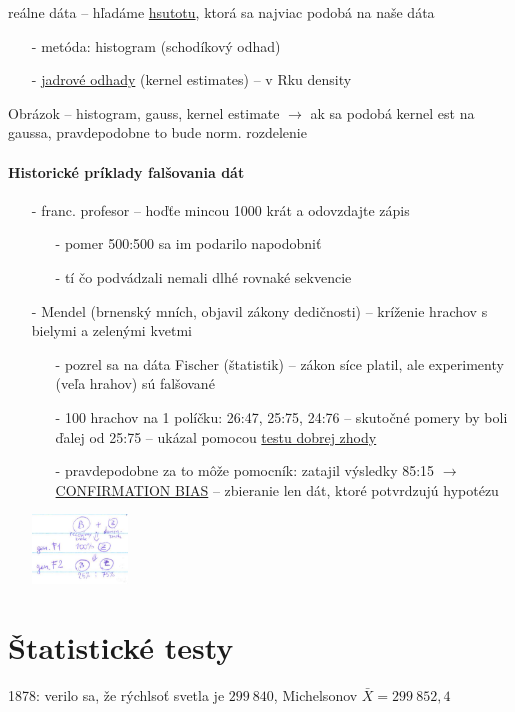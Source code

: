 \documentclass[unknownkeysallowed]{article}
\begin{document}
reálne dáta -- hľadáme \underline{hsutotu}, ktorá sa najviac podobá na naše dáta
\begin{itemize}
\item[-] metóda: histogram (schodíkový odhad)
\item[-] \underline{jadrové odhady} (kernel estimates) -- v Rku density
\end{itemize}

Obrázok -- histogram, gauss, kernel estimate $\to$ ak sa podobá kernel est na gaussa, pravdepodobne to bude norm. rozdelenie

\paragraph{Historické príklady falšovania dát}
\begin{itemize}
\item[-] franc. profesor -- hoďťe mincou 1000 krát a odovzdajte zápis
	\begin{itemize}
	\item[-] pomer 500:500 sa im podarilo napodobniť
	\item[-] tí čo podvádzali nemali dlhé rovnaké sekvencie
	\end{itemize}
\item[-] Mendel (brnenský mních, objavil zákony dedičnosti) -- kríženie hrachov s bielymi a zelenými kvetmi
	\begin{multicols}{2}
	\begin{itemize}
	\item[-] pozrel sa na dáta Fischer (štatistik) -- zákon síce platil, ale experimenty (veľa hrahov) sú falšované
	\item[-] 100 hrachov na 1 políčku: 26:47, 25:75, 24:76 -- skutočné pomery by boli ďalej od 25:75 -- ukázal pomocou \underline{testu dobrej zhody}
	\item[-] pravdepodobne za to môže pomocník: zatajil výsledky 85:15 $\to$ \underline{CONFIRMATION BIAS} -- zbieranie len dát, ktoré potvrdzujú hypotézu
	\end{itemize}
	\columnbreak
	\includegraphics[width=0.2\textwidth]{imgs/obr14.png}
	\end{multicols}
\end{itemize}

\section*{Štatistické testy}
1878: verilo sa, že rýchlsoť svetla je $299~840$, Michelsonov $\bar{X} = 299~852,4$
\end{document}
